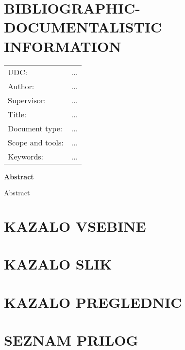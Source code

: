 \section*{BIBLIOGRAPHIC-DOCUMENTALISTIC INFORMATION}

\begin{bf}
    \vspace{-1.5mm}\hspace{-2.25mm}
    \begin{tabular}{p{3.75cm} l}
        UDC: &  ... \\
        Author: & ...\\
        Supervisor: & ...\\
        Title: & ...\\
        Document type: & ... \\
        Scope and tools:  & ...\\
        Keywords: & ...
    \end{tabular}
\end{bf}

\vspace{1cm}

\noindent\textbf{Abstract}

\vspace{4mm}

\noindent Abstract
\break




\clearpage
\section*{KAZALO VSEBINE}
\vspace{-1cm}
\tableofcontents

\clearpage
\section*{KAZALO SLIK}
\vspace{-1cm}
\listoffigures

\clearpage
\section*{KAZALO PREGLEDNIC}
\vspace{-1cm}
\listoftables
\clearpage

\section*{SEZNAM PRILOG}
\vspace{-1cm}
\listofpriloge
